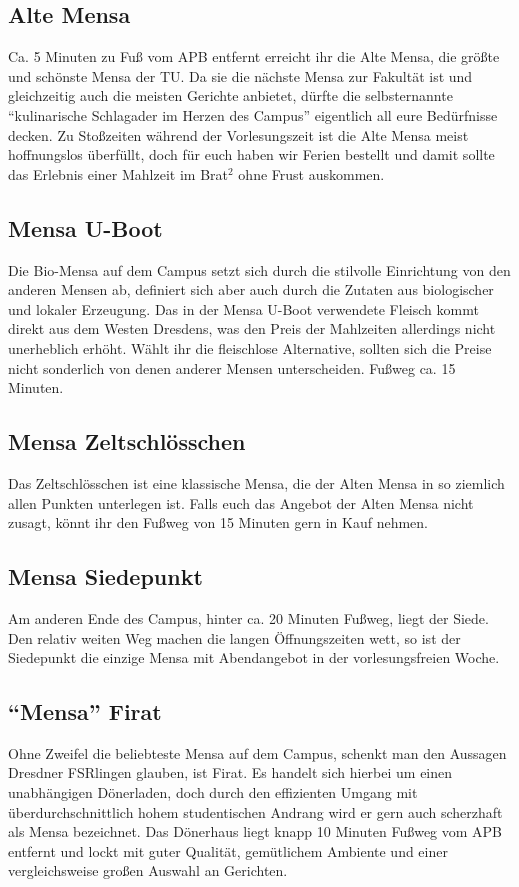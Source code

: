 \subsection*{Alte Mensa}
Ca. 5 Minuten zu Fuß vom APB entfernt erreicht ihr die Alte Mensa, die größte und schönste Mensa der TU\@.
Da sie die nächste Mensa zur Fakultät ist und gleichzeitig auch die meisten Gerichte anbietet, dürfte die selbsternannte \enquote{kulinarische Schlagader im Herzen des Campus} eigentlich all eure Bedürfnisse decken.
Zu Stoßzeiten während der Vorlesungszeit ist die Alte Mensa meist hoffnungslos überfüllt, doch für euch haben wir Ferien bestellt und damit sollte das Erlebnis einer Mahlzeit im Brat$^2$ ohne Frust auskommen.

\subsection*{Mensa U-Boot}
Die Bio-Mensa auf dem Campus setzt sich durch die stilvolle Einrichtung von den anderen Mensen ab, definiert sich aber auch durch die Zutaten aus biologischer und lokaler Erzeugung.
Das in der Mensa U-Boot verwendete Fleisch kommt direkt aus dem Westen Dresdens, was den Preis der Mahlzeiten allerdings nicht unerheblich erhöht.
Wählt ihr die fleischlose Alternative, sollten sich die Preise nicht sonderlich von denen anderer Mensen unterscheiden.
Fußweg ca. 15 Minuten.

\subsection*{Mensa Zeltschlösschen}
Das Zeltschlösschen ist eine klassische Mensa, die der Alten Mensa in so ziemlich allen Punkten unterlegen ist.
Falls euch das Angebot der Alten Mensa nicht zusagt, könnt ihr den Fußweg von 15 Minuten gern in Kauf nehmen.

\subsection*{Mensa Siedepunkt}
Am anderen Ende des Campus, hinter ca. 20 Minuten Fußweg, liegt der Siede.
Den relativ weiten Weg machen die langen Öffnungszeiten wett, so ist der Siedepunkt die einzige Mensa mit Abendangebot in der vorlesungsfreien Woche.

\subsection*{\enquote{Mensa} Firat}
Ohne Zweifel die beliebteste Mensa auf dem Campus, schenkt man den Aussagen Dresdner FSRlingen glauben, ist Firat.
Es handelt sich hierbei um einen unabhängigen Dönerladen, doch durch den effizienten Umgang mit überdurchschnittlich hohem studentischen Andrang wird er gern auch scherzhaft als Mensa bezeichnet.
Das Dönerhaus liegt knapp 10 Minuten Fußweg vom APB entfernt und lockt mit guter Qualität, gemütlichem Ambiente und einer vergleichsweise großen Auswahl an Gerichten.

